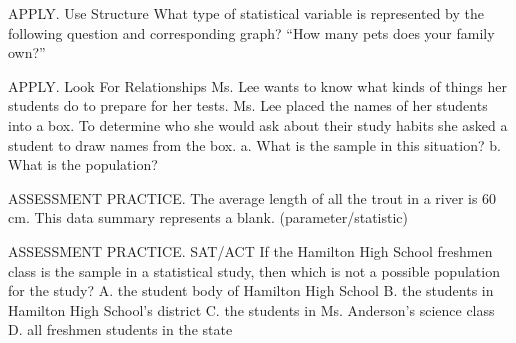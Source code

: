 \documentclass{article}
\newenvironment{practice}[2]{}{}        %
\newcommand{\answer}[1]{}               %
\newcommand{\placeholder}[2]{}          %
\begin{document}
\begin{practice}{18}{1}
APPLY. Use Structure What type of statistical variable is represented by the following question and corresponding graph?
``How many pets does your family own?''
\placeholder{graph}{Pets Owned orange bar graph. Horizontal Number of Pets, 0,1,2,3,4; vertical Frequency of Families 0 through 12 every 2. Separate bars at 0:6,1:10,2:5,3:2,4:1. Horizontal dotted grid every 2; no arrows.}
\answer{This is a quantitative statistical question because the responses are numerical in nature and can be used in calculations.}
\end{practice}
\begin{practice}{19}{1}
APPLY. Look For Relationships Ms. Lee wants to know what kinds of things her students do to prepare for her tests. Ms. Lee placed the names of her students into a box. To determine who she would ask about their study habits she asked a student to draw names from the box.
a. What is the sample in this situation?
b. What is the population?
\answer{a. The sample is the students whose names were randomly drawn. b. The population is all of Ms. Lee's students.}
\end{practice}
\begin{practice}{20}{1}
ASSESSMENT PRACTICE. The average length of all the trout in a river is 60 cm. This data summary represents a blank. (parameter/statistic)
\answer{parameter}
\end{practice}
\begin{practice}{21}{1}
ASSESSMENT PRACTICE. SAT/ACT If the Hamilton High School freshmen class is the sample in a statistical study, then which is not a possible population for the study?
A. the student body of Hamilton High School
B. the students in Hamilton High School's district
C. the students in Ms. Anderson's science class
D. all freshmen students in the state
\answer{C}
\end{practice}
\end{document}
